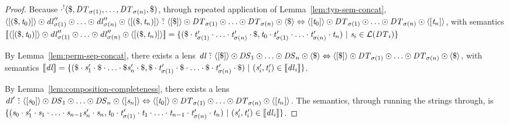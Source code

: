 \documentclass[acmsmall]{acmart}
\begin{document}
\begin{proof}
  Because
  $\cdot^!(\$,\mathit{DT}_{\sigma(1)},\ldots,\mathit{DT}_{\sigma(n)},\$)$,
  through repeated application of
  Lemma~\ref{lem:typ-sem-concat},
  $\langle[(\$,\mathit{t}_0)]\rangle \odot \mathit{dl}_{\sigma(1)}'' \odot
  \ldots \odot \mathit{dl}_{\sigma(n)}'' \odot
  \langle[(\$,\mathit{t}_n)]\rangle \,\,\tilde{:}\,\,
  \langle[\$]\rangle \odot \mathit{DT}_{\sigma(1)} \odot \ldots
  \odot \mathit{DT}_{\sigma(n)} \odot \langle\$\rangle
  \Leftrightarrow
  \langle[\mathit{t}_0]\rangle \odot \mathit{DT}_{\sigma(1)} \odot \ldots
  \odot \mathit{DT}_{\sigma(n)} \odot \langle[\mathit{t}_n]\rangle$, with semantics
  $[ \! [\langle[(\$,\mathit{t}_0)]\rangle \odot \mathit{dl}_{\sigma(1)}'' \odot
    \ldots \odot \mathit{dl}_{\sigma(n)}'' \odot
    \langle[(\$,\mathit{t}_n)]\rangle] \! ] =
  \{(\$\cdot\mathit{t}_{\sigma(1)}'\cdot\ldots\cdot\mathit{t}_{\sigma(n)}'\cdot\$,
    \mathit{t}_0\cdot\mathit{t}_{\sigma(1)}'\cdot\ldots\cdot\mathit{t}_{\sigma(n)}'\cdot\mathit{t}_n) ~|~
    \mathit{s}_i\in\mathcal{L}(\mathit{DT}_i)\}$
  
  By Lemma~\ref{lem:perm-sep-concat},
  there exists a lens $\mathit{dl} \,\,\tilde{:}\,\, \langle[\$]\rangle \odot \mathit{DS}_1 \odot \ldots
  \odot \mathit{DS}_n \odot \langle\$\rangle \Leftrightarrow
  \langle[\$]\rangle \odot \mathit{DT}_{\sigma(1)} \odot \ldots
  \odot \mathit{DT}_{\sigma(n)} \odot \langle\$\rangle$, with semantics
  $[ \! [\mathit{dl}] \! ] = \{(\$\cdot\mathit{s}_1'\cdot\$\cdot\ldots\cdot\$\mathit{s}_n'\cdot\$,
    \$\cdot\mathit{t}_{\sigma(1)}'\cdot\$\cdot\ldots\cdot\$\cdot\mathit{t}_{\sigma(n)}'\cdot\$)
    ~|~
    (\mathit{s}_i',\mathit{t}_i') \in [ \! [\mathit{dl}_i] \! ]\}$.

  By Lemma~\ref{lem:composition-completeness},
  there exists a lens $\mathit{dl}' \,\,\tilde{:}\,\, \langle[\mathit{s}_0]\rangle \odot \mathit{DS}_1 \odot \ldots
  \odot \mathit{DS}_n \odot \langle[\mathit{s}_n]\rangle
  \Leftrightarrow
  \langle[\mathit{t}_0]\rangle \odot \mathit{DT}_{\sigma(1)} \odot \ldots
  \odot \mathit{DT}_{\sigma(n)} \odot
  \langle[\mathit{t}_n]\rangle$.
  The semantics, through running the strings through, is $\{(\mathit{s}_0\cdot\mathit{s}_1'\cdot\mathit{s}_1\cdot\ldots\cdot\mathit{s}_{n-1}\mathit{s}_n'\cdot\mathit{s}_n,
    \mathit{t}_0\cdot\mathit{t}_{\sigma(1)}'\cdot\mathit{t}_1\cdot\ldots\cdot\mathit{t}_{n-1}\cdot\mathit{t}_{\sigma(n)}'\cdot\mathit{t}_n)
    ~|~
  (\mathit{s}_i',\mathit{t}_i') \in [ \! [\mathit{dl}_i] \! ]\}$.
\end{proof}
\end{document}
